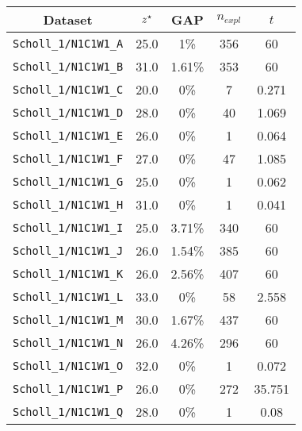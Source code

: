 \begin{figure}[!ht]
	\centering
	\scriptsize{
	\begin{minipage}{0.47\linewidth}
		\centering
		\begin{tabular}{|ccccc|}
			\hline
			\rowcolor{gray!50}
			Dataset                      & ${z}^{\star}$ & GAP & $n_{expl}$ & $t$ \\
			\hline
			\texttt{Scholl\_1/N1C1W1\_A} & 25.0           & 1\% & 356               & 60       \\
			\texttt{Scholl\_1/N1C1W1\_B} & 31.0           & 1.61\% & 353               & 60    \\
			\texttt{Scholl\_1/N1C1W1\_C} & 20.0           & 0\% & 7               & 0.271       \\
			\texttt{Scholl\_1/N1C1W1\_D} & 28.0           & 0\% & 40               & 1.069       \\
			\texttt{Scholl\_1/N1C1W1\_E} & 26.0           & 0\% & 1               & 0.064       \\
			\texttt{Scholl\_1/N1C1W1\_F} & 27.0           & 0\% & 47               & 1.085       \\
			\texttt{Scholl\_1/N1C1W1\_G} & 25.0           & 0\% & 1               & 0.062       \\
			\texttt{Scholl\_1/N1C1W1\_H} & 31.0           & 0\% & 1               & 0.041       \\
			\texttt{Scholl\_1/N1C1W1\_I} & 25.0           & 3.71\% & 340               & 60       \\
			\texttt{Scholl\_1/N1C1W1\_J} & 26.0           & 1.54\% & 385               & 60       \\
			\texttt{Scholl\_1/N1C1W1\_K} & 26.0           & 2.56\% & 407               & 60       \\
			\texttt{Scholl\_1/N1C1W1\_L} & 33.0           & 0\% & 58               & 2.558       \\
			\texttt{Scholl\_1/N1C1W1\_M} & 30.0           & 1.67\% & 437               & 60       \\
			\texttt{Scholl\_1/N1C1W1\_N} & 26.0           & 4.26\% & 296               & 60       \\
			\texttt{Scholl\_1/N1C1W1\_O} & 32.0           & 0\% & 1               & 0.072       \\
			\texttt{Scholl\_1/N1C1W1\_P} & 26.0           & 0\% & 272               & 35.751       \\
			\texttt{Scholl\_1/N1C1W1\_Q} & 28.0           & 0\% & 1               & 0.08       \\

\end{tabular}
\end{minipage}}
\end{figure}
